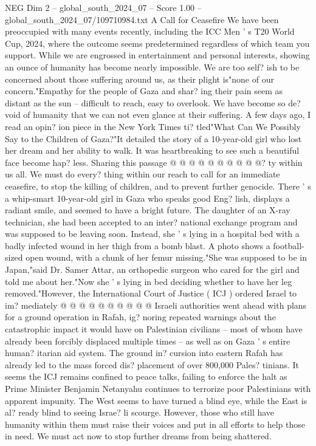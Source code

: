 \begin{textsample}{NEG Dim 2 – global\_south\_2024\_07 – Score 1.00 – global\_south\_2024\_07/109710984.txt}  \label{ex:f2_neg_374}
A Call for Ceasefire We have been preoccupied with many events recently, including the ICC Men ' s T20 World Cup, 2024, where the outcome seems predetermined regardless of which team you support.
While we are engrossed in entertainment and personal interests, showing an ounce of humanity has become nearly impossible.
We are too self? ish to be concerned about those suffering around us, as their plight is"none of our concern."Empathy for the people of Gaza and shar? ing their pain seem as distant as the sun -- difficult to reach, easy to overlook.
We have become so de? void of humanity that we can not even glance at their suffering.
A few days ago, I read an opin? ion piece in the New York Times ti? tled"What Can We Possibly Say to the Children of Gaza?"It detailed the story of a 10-year-old girl who lost her dream and her ability to walk.
It was heartbreaking to see such a beautiful face become hap? less.
Sharing this passage @ @ @ @ @ @ @ @ @ @? ty within us all.
We must do every? thing within our reach to call for an immediate ceasefire, to stop the killing of children, and to prevent further genocide.
There ' s a whip-smart 10-year-old girl in Gaza who speaks good Eng? lish, displays a radiant smile, and seemed to have a bright future.
The daughter of an X-ray technician, she had been accepted to an inter? national exchange program and was supposed to be leaving soon.
Instead, she ' s lying in a hospital bed with a badly infected wound in her thigh from a bomb blast.
A photo shows a football-sized open wound, with a chunk of her femur missing."She was supposed to be in Japan,"said Dr.
Samer Attar, an orthopedic surgeon who cared for the girl and told me about her."Now she ' s lying in bed deciding whether to have her leg removed."However, the International Court of Justice ( ICJ ) ordered Israel to im? mediately @ @ @ @ @ @ @ @ @ @ Israeli authorities went ahead with plans for a ground operation in Rafah, ig? noring repeated warnings about the catastrophic impact it would have on Palestinian civilians -- most of whom have already been forcibly displaced multiple times -- as well as on Gaza ' s entire human? itarian aid system.
The ground in? cursion into eastern Rafah has already led to the mass forced dis? placement of over 800,000 Pales? tinians.
It seems the ICJ remains confined to peace talks, failing to enforce the halt as Prime Minister Benjamin Netanyahu continues to terrorize poor Palestinians with apparent impunity.
The West seems to have turned a blind eye, while the East is al? ready blind to seeing Israe? li scourge.
However, those who still have humanity within them must raise their voices and put in all efforts to help those in need.
We must act now to stop further dreams from being shattered.

\end{textsample}
